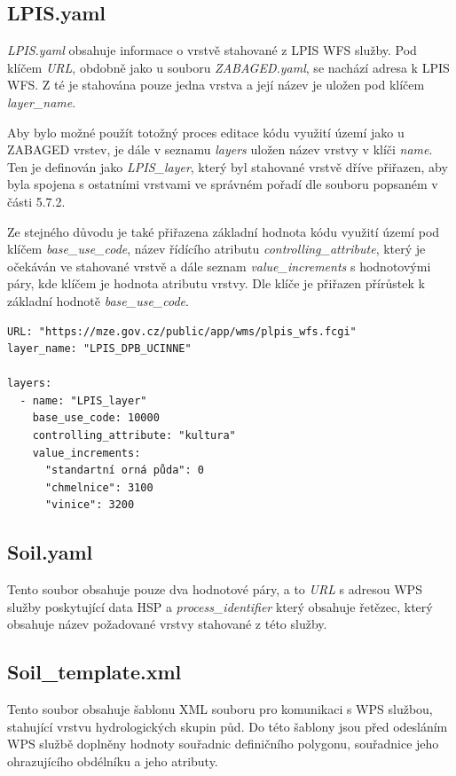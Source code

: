 \documentclass[a4paper,oneside,12pt]{book}
\begin{document}
\subsection{LPIS.yaml} \label{LPIS.yaml}
\hspace{10mm} \textit{LPIS.yaml} obsahuje informace o vrstvě stahované z LPIS WFS služby. Pod klíčem \textit{URL}, obdobně jako u souboru \textit{ZABAGED.yaml}, se nachází adresa k LPIS WFS. Z té je stahována pouze jedna vrstva a její název je uložen pod klíčem \textit{layer\_name}.

\hspace{10mm} Aby bylo možné použít totožný proces editace kódu využití území jako u ZABAGED vrstev, je dále v seznamu \textit{layers} uložen název vrstvy v klíči \textit{name}. Ten je definován jako \textit{LPIS\_layer}, který byl stahované vrstvě dříve přiřazen, aby byla spojena s ostatními vrstvami ve správném pořadí dle souboru popsaném v části 5.7.2.

\hspace{10mm}Ze stejného důvodu je také přiřazena základní hodnota kódu využití území pod klíčem \textit{base\_use\_code}, název řídícího atributu \textit{controlling\_attribute}, který je očekáván ve stahované vrstvě a dále seznam \textit{value\_increments} s hodnotovými páry, kde klíčem je hodnota atributu vrstvy. Dle klíče je přiřazen přírůstek k základní hodnotě \textit{base\_use\_code}.

\begin{lstlisting}[style=myyaml, caption={Ukázka LPIS.yaml},label={kod:LPIS.yaml}]
URL: "https://mze.gov.cz/public/app/wms/plpis_wfs.fcgi"
layer_name: "LPIS_DPB_UCINNE"

layers:
  - name: "LPIS_layer"
    base_use_code: 10000
    controlling_attribute: "kultura"
    value_increments:
      "standartní orná půda": 0
      "chmelnice": 3100
      "vinice": 3200
\end{lstlisting}

\subsection{Soil.yaml} \label{Soil.yaml}
Tento soubor obsahuje pouze dva hodnotové páry, a to \textit{URL} s adresou WPS služby poskytující data HSP a \textit{process\_identifier} který obsahuje řetězec, který obsahuje název požadované vrstvy stahované z této služby.


\subsection{Soil\_template.xml} \label{Soil_template.xml}
\hspace{10mm} Tento soubor obsahuje šablonu XML souboru pro komunikaci s WPS službou, stahující vrstvu hydrologických skupin půd.
Do této šablony jsou před odesláním WPS službě doplněny hodnoty souřadnic definičního polygonu, souřadnice jeho ohrazujícího obdélníku a jeho atributy.
\end{document}
